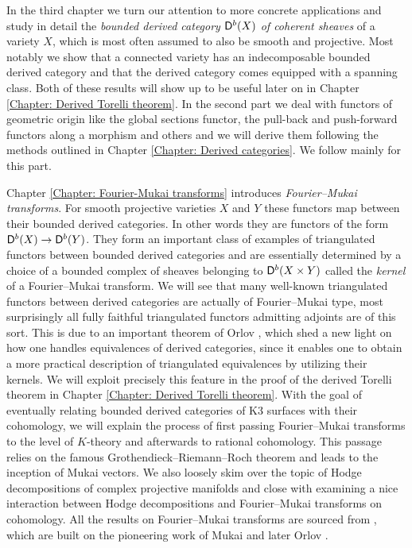 In the third chapter we turn our attention to more concrete applications and study in detail the \emph{bounded derived category $\mathsf{D}^b(X)$ of coherent sheaves} of a variety $X$, which is most often assumed to also be smooth and projective. Most notably we show that a connected variety has an indecomposable bounded derived category and that the derived category comes equipped with a spanning class. Both of these results will show up to be useful later on in Chapter \ref{Chapter: Derived Torelli theorem}. In the second part we deal with functors of geometric origin like the global sections functor, the pull-back and push-forward functors along a morphism and others and we will derive them following the methods outlined in Chapter \ref{Chapter: Derived categories}. We follow mainly \cite[\S 3]{huybrechts2006fouriermukai} for this part.

Chapter \ref{Chapter: Fourier-Mukai transforms} introduces \emph{Fourier--Mukai transforms}. For smooth projective varieties $X$ and $Y$ these functors map between their bounded derived categories. In other words they are functors of the form $\mathsf{D}^b(X) \to \mathsf{D}^b(Y)$. They form an important class of examples of triangulated functors between bounded derived categories and are essentially determined by a choice of a bounded complex of sheaves belonging to $\mathsf{D}^b(X \times Y)$ called the \emph{kernel} of a Fourier--Mukai transform. We will see that many well-known triangulated functors between  derived categories 
are actually of Fourier--Mukai type, most surprisingly all fully faithful triangulated functors admitting adjoints are of this sort. This is due to an important theorem of Orlov \cite{Orlov2003}, which shed a new light on how one handles equivalences of derived categories, since it enables one to obtain a more practical description of triangulated equivalences by utilizing their kernels. We will exploit precisely this feature in the proof of the derived Torelli theorem in Chapter \ref{Chapter: Derived Torelli theorem}. With the goal of eventually relating bounded derived categories of K3 surfaces with their cohomology, we will explain the process of first passing Fourier--Mukai transforms to the level of $K$-theory and afterwards to rational cohomology. This passage relies on the famous Grothendieck--Riemann--Roch theorem and leads to the inception of Mukai vectors. 
We also loosely skim over the topic of Hodge decompositions of complex projective manifolds and close with examining a nice interaction between Hodge decompositions and Fourier--Mukai transforms on cohomology. All the results on Fourier--Mukai transforms are sourced from \cite[\S 5]{huybrechts2006fouriermukai}, which are built on the pioneering work of Mukai \cite{Mukai1981} and later Orlov \cite{Orlov2003}.

